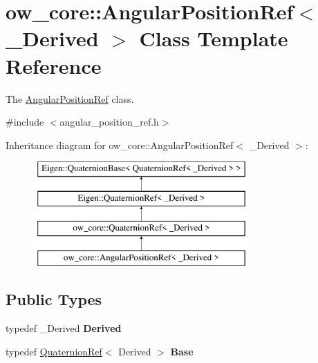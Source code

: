 \hypertarget{classow__core_1_1AngularPositionRef}{}\section{ow\+\_\+core\+:\+:Angular\+Position\+Ref$<$ \+\_\+\+Derived $>$ Class Template Reference}
\label{classow__core_1_1AngularPositionRef}


The \hyperlink{classow__core_1_1AngularPositionRef}{Angular\+Position\+Ref} class.  




{\ttfamily \#include $<$angular\+\_\+position\+\_\+ref.\+h$>$}

Inheritance diagram for ow\+\_\+core\+:\+:Angular\+Position\+Ref$<$ \+\_\+\+Derived $>$\+:\begin{figure}[H]
\begin{center}
\leavevmode
\includegraphics[height=4.000000cm]{db/d23/classow__core_1_1AngularPositionRef}
\end{center}
\end{figure}
\subsection*{Public Types}
\begin{DoxyCompactItemize}
\item 
typedef \+\_\+\+Derived {\bfseries Derived}\hypertarget{classow__core_1_1AngularPositionRef_a66f7abe85130a4a26a8fd6a566dc5423}{}\label{classow__core_1_1AngularPositionRef_a66f7abe85130a4a26a8fd6a566dc5423}

\item 
typedef \hyperlink{classow__core_1_1QuaternionRef}{Quaternion\+Ref}$<$ Derived $>$ {\bfseries Base}\hypertarget{classow__core_1_1AngularPositionRef_a8332ab03e73f58c27f92c170894d67b7}{}\label{classow__core_1_1AngularPositionRef_a8332ab03e73f58c27f92c170894d67b7}

\end{DoxyCompactItemize}
